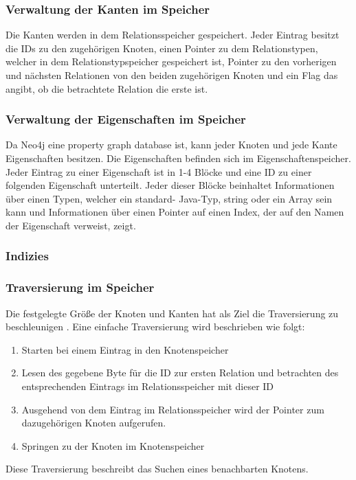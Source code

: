 \subsubsection{Verwaltung der Kanten im Speicher}
Die Kanten werden in dem Relationsspeicher gespeichert. Jeder Eintrag besitzt die IDs zu den zugehörigen Knoten, einen Pointer zu dem Relationstypen, welcher in dem Relationstypspeicher gespeichert ist, Pointer zu den vorherigen und nächsten Relationen von den beiden zugehörigen Knoten und ein Flag das angibt, ob die betrachtete Relation die erste ist. \newline
\subsubsection{Verwaltung der Eigenschaften im Speicher}
Da Neo4j eine property graph database ist, kann jeder Knoten und jede Kante  Eigenschaften besitzen. Die Eigenschaften befinden sich im Eigenschaftenspeicher.  Jeder Eintrag zu einer Eigenschaft ist in 1-4 Blöcke und eine ID zu einer folgenden Eigenschaft unterteilt. Jeder dieser Blöcke beinhaltet Informationen über einen Typen, welcher ein standard- Java-Typ, string oder ein Array sein kann und Informationen über einen Pointer auf einen Index, der auf den Namen der Eigenschaft verweist, zeigt.  \newline
\subsubsection{Indizies}
\subsubsection {Traversierung im Speicher}
Die festgelegte Größe der Knoten und Kanten hat als Ziel die Traversierung zu beschleunigen \parencite{robinson2013graph}. Eine einfache Traversierung wird beschrieben wie folgt: 
\begin{enumerate}
	\item Starten bei einem Eintrag in den Knotenspeicher
	\item Lesen des gegebene Byte für die ID zur ersten Relation und betrachten des entsprechenden Eintrags im Relationsspeicher mit dieser ID
	\item Ausgehend von dem Eintrag im Relationsspeicher wird der Pointer zum dazugehörigen Knoten aufgerufen.
	\item Springen zu der Knoten im Knotenspeicher
\end{enumerate}
Diese Traversierung beschreibt das Suchen eines benachbarten Knotens.
